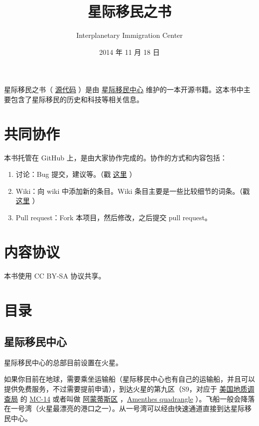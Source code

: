 \documentclass[letterpaper,10pt]{sphinxmanual}
\title{星际移民之书}
\date{2014 年 11 月 18 日}
\author{Interplanetary Immigration Center}
\begin{document}
\maketitle
\tableofcontents
{}\label{index::doc}


星际移民之书（ \href{https://github.com/InterImm/InterImmBook}{源代码} ）是由 \href{http://interimm.org/}{星际移民中心} 维护的一本开源书籍。这本书中主要包含了星际移民的历史和科技等相关信息。


\chapter{共同协作}
\label{index:id4}\label{index:id1}
本书托管在 GitHub 上，是由大家协作完成的。协作的方式和内容包括：
\begin{enumerate}
\item {} 
讨论：Bug 提交，建议等。（戳 \href{https://github.com/InterImm/InterImmBook/issues}{这里} ）

\item {} 
Wiki：向 wiki 中添加新的条目。Wiki 条目主要是一些比较细节的词条。（戳 \href{https://github.com/InterImm/InterImmBook/wiki}{这里} ）

\item {} 
Pull request：Fork 本项目，然后修改，之后提交 pull request。

\end{enumerate}


\chapter{内容协议}
\label{index:id7}
本书使用 CC BY-SA 协议共享。


\chapter{目录}
\label{index:id8}

\section{星际移民中心}
\label{InterImm::doc}\label{InterImm:id1}
星际移民中心的总部目前设置在火星。

如果你目前在地球，需要乘坐运输船（星际移民中心也有自己的运输船，并且可以提供免费服务，不过需要提前申请），到达火星的第九区（S9，对应于 \href{http://zh.wikipedia.org/wiki/\%E7\%BE\%8E\%E5\%9C\%8B\%E5\%9C\%B0\%E8\%B3\%AA\%E8\%AA\%BF\%E6\%9F\%A5\%E5\%B1\%80}{美国地质调查局} 的 \href{http://en.wikipedia.org/wiki/Geography\_of\_Mars\#Map\_of\_quadrangles}{MC-14} 或者叫做 \href{http://zh.wikipedia.org/wiki/\%E9\%98\%BF\%E8\%92\%99\%E8\%92\%82\%E6\%96\%AF\%E5\%8C\%BA}{阿蒙蒂斯区} ，\href{http://en.wikipedia.org/wiki/Amenthes\_quadrangle}{Amenthes quadrangle} ）。飞船一般会降落在一号湾（火星最漂亮的港口之一）。从一号湾可以经由快速通道直接到达星际移民中心。
\end{document}
